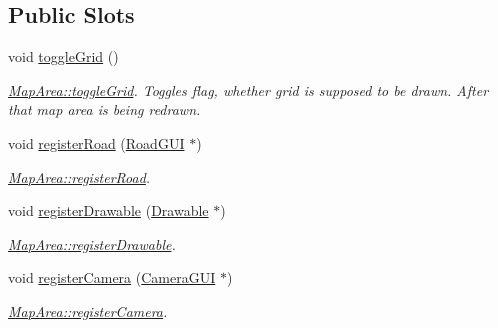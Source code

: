 \subsection*{Public Slots}
\begin{DoxyCompactItemize}
\item 
\hypertarget{classMapArea_a1b2849d172c0941b3af68920dfd368de}{void \hyperlink{classMapArea_a1b2849d172c0941b3af68920dfd368de}{toggle\-Grid} ()}\label{classMapArea_a1b2849d172c0941b3af68920dfd368de}

\begin{DoxyCompactList}\small\item\em \hyperlink{classMapArea_a1b2849d172c0941b3af68920dfd368de}{Map\-Area\-::toggle\-Grid}. Toggles flag, whether grid is supposed to be drawn. After that map area is being redrawn. \end{DoxyCompactList}\item 
void \hyperlink{classMapArea_a71861f7055ae8107b8d69373c2629c5d}{register\-Road} (\hyperlink{classRoadGUI}{Road\-G\-U\-I} $\ast$)
\begin{DoxyCompactList}\small\item\em \hyperlink{classMapArea_a71861f7055ae8107b8d69373c2629c5d}{Map\-Area\-::register\-Road}. \end{DoxyCompactList}\item 
void \hyperlink{classMapArea_ace67fcedbc4d657eff057f0e67a22623}{register\-Drawable} (\hyperlink{classDrawable}{Drawable} $\ast$)
\begin{DoxyCompactList}\small\item\em \hyperlink{classMapArea_ace67fcedbc4d657eff057f0e67a22623}{Map\-Area\-::register\-Drawable}. \end{DoxyCompactList}\item 
void \hyperlink{classMapArea_ae50597953aea6204e9ab271dcf5b6154}{register\-Camera} (\hyperlink{classCameraGUI}{Camera\-G\-U\-I} $\ast$)
\begin{DoxyCompactList}\small\item\em \hyperlink{classMapArea_ae50597953aea6204e9ab271dcf5b6154}{Map\-Area\-::register\-Camera}. \end{DoxyCompactList}\end{DoxyCompactItemize}
